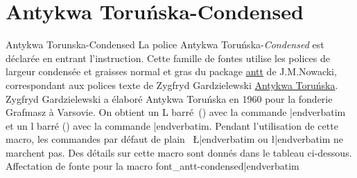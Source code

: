 	\BlackBoxes								













   \fontss
\section{{\sixteenbf\fontss Antykwa Toru\'nska}-{\sixteenslbf Condensed}}{Antykwa Torunska-Condensed}
\sample
\ii La police Antykwa Toru\'nska-{\sl Condensed\/} est d\'eclar\'ee en entrant l'instruction\break {\color{brown}\verbatim}. Cette famille de fontes utilise les polices de largeur condens\'ee et graisses normal et gras du package  \href{http://www.tex.ac.uk/tex-archive/help/Catalogue/entries/antt.html}{antt} de J.\;M.\;Nowacki, correspondant aux polices texte de Zygfryd Gardzielewski \href{http://nowacki.strefa.pl/torunska-e.html}{Antykwa Toru\'nska}. Zygfryd Gardzielewski a \'elabor\'e Antykwa Toru\'nska en 1960 pour la fonderie Grafmasz \`a Varsovie. On obtient un L barr\'e~(\Lstroke) avec la commande {\color{brown}\verbatim\Lstroke|endverbatim} et un l barr\'e (\lstroke) avec la commande {\color{brown}\verbatim\lstroke|endverbatim}. Pendant l'utilisation de cette macro, les commandes par d\'efaut de plain \capstex\ {\color{brown}\verbatim\L|endverbatim} ou {\color{brown}\verbatim\l|endverbatim} ne marchent pas. Des d\'etails sur cette macro sont donn\'es dans le tableau ci-dessous.
\bs
\hfil{Affectation de fonte pour la macro {\color{brown}\verbatim font_antt-condensed|endverbatim}}\hfil	
													
